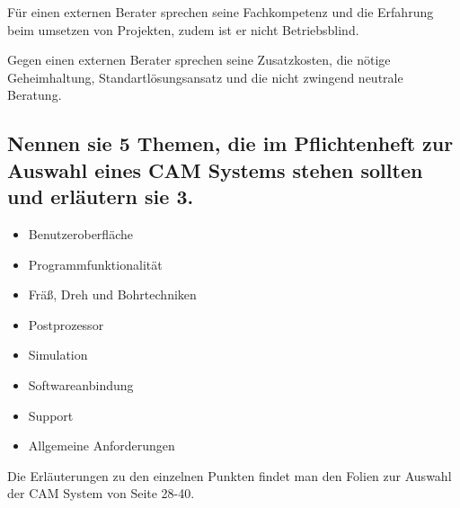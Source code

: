 Für einen externen Berater sprechen seine Fachkompetenz und die Erfahrung beim umsetzen von Projekten, zudem ist er nicht Betriebsblind.

Gegen einen externen Berater sprechen seine Zusatzkosten, die nötige Geheimhaltung, Standartlösungsansatz und die nicht zwingend neutrale Beratung.


\subsection*{Nennen sie 5 Themen, die im Pflichtenheft zur Auswahl eines CAM Systems stehen sollten und erläutern sie 3.}

\begin{itemize}
\item Benutzeroberfläche
\item Programmfunktionalität
\item Fräß, Dreh und Bohrtechniken
\item Postprozessor
\item Simulation
\item Softwareanbindung
\item Support
\item Allgemeine Anforderungen
\end{itemize}

Die Erläuterungen zu den einzelnen Punkten findet man den Folien zur Auswahl der CAM System von Seite 28-40.



